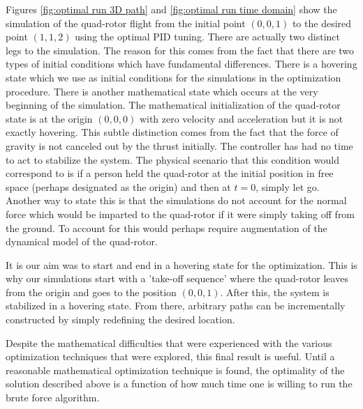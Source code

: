 Figures \ref{fig:optimal run 3D path} and \ref{fig:optimal run time domain} show the simulation of the quad-rotor flight from the initial point $(0,0,1)$ to the desired point $(1,1,2)$ using the optimal PID tuning. There are actually two distinct legs to the simulation. The reason for this comes from the fact that there are two types of initial conditions which have fundamental differences. There is a hovering state which we use as initial conditions for the simulations in the optimization procedure. There is another mathematical state which occurs at the very beginning of the simulation. The mathematical initialization of the quad-rotor state is at the origin $(0,0,0)$ with zero velocity and acceleration but it is not exactly hovering. This subtle distinction comes from the fact that the force of gravity is not canceled out by the thrust initially. The controller has had no time to act to stabilize the system. The physical scenario that this condition would correspond to is if a person held the quad-rotor at the initial position in free space (perhaps designated as the origin) and then at $t=0$, simply let go. Another way to state this is that the simulations do not account for the normal force which would be imparted to the quad-rotor if it were simply taking off from the ground. To account for this would perhaps require augmentation of the dynamical model of the quad-rotor. 

It is our aim was to start and end in a hovering state for the optimization. This is why our simulations start with a 'take-off sequence' where the quad-rotor leaves from the origin and goes to the position $(0,0,1)$. After this, the system is stabilized in a hovering state. From there, arbitrary paths can be incrementally constructed by simply redefining the desired location.

Despite the mathematical difficulties that were experienced with the various optimization techniques that were explored, this final result is useful. Until a reasonable mathematical optimization technique is found, the optimality of the solution described above is a function of how much time one is willing to run the brute force algorithm. 































